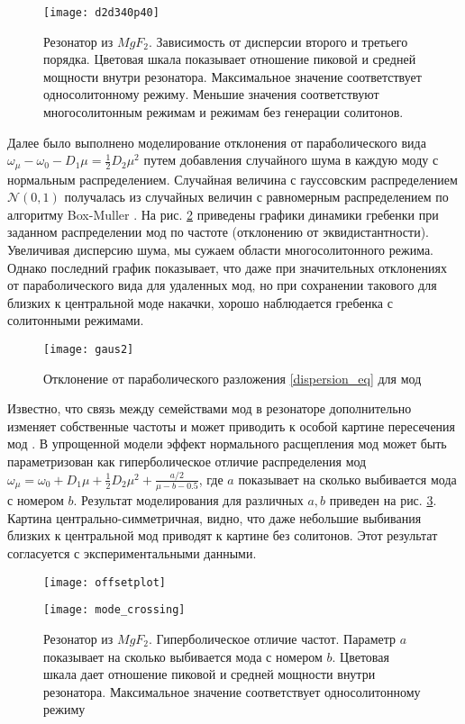 \begin{figure}
  \centering
  \texttt{[image: d2d340p40]}
  \caption{Резонатор из $MgF_2$. Зависимость от дисперсии второго и третьего порядка. Цветовая шкала показывает отношение пиковой и средней мощности внутри резонатора. Максимальное значение соответствует односолитонному режиму. Меньшие значения соответствуют многосолитонным режимам и режимам без генерации солитонов.} \label{d2d3_plot}
\end{figure}

Далее было выполнено моделирование отклонения от параболического вида $\omega_\mu-\omega_0-D_1\mu=\frac{1}{2}D_2\mu^2$ путем добавления случайного шума в каждую моду с нормальным распределением. Случайная величина с гауссовским распределением $\mathcal{N}(0,1)$ получалась из случайных величин с равномерным распределением по алгоритму Box-Muller \cite{Numercial_recipes}. На рис. \ref{gaus} приведены графики динамики гребенки при заданном распределении мод по частоте (отклонению от эквидистантности). Увеличивая дисперсию шума, мы сужаем области многосолитонного режима. Однако последний график показывает, что даже при значительных отклонениях от параболического вида для удаленных мод, но при сохранении такового для близких к центральной моде накачки, хорошо наблюдается гребенка с солитонными режимами.

\begin{figure}
  \centering
  \texttt{[image: gaus2]}
  \caption{Отклонение от параболического разложения \eqref{dispersion_eq} для мод} \label{gaus}
\end{figure}

Известно, что связь между семействами мод в резонаторе дополнительно изменяет собственные частоты и может приводить к особой картине пересечения мод \cite{mode_spectrum_MLG}. В упрощенной модели эффект нормального расщепления мод может быть параметризован как гиперболическое отличие распределения мод $\omega_\mu=\omega_0+D_1\mu+\frac{1}{2}D_2\mu^2+\frac{a/2}{\mu-b-0.5}$, где $a$ показывает на сколько выбивается мода с номером $b$. Результат моделирования для различных $a,b$ приведен на рис. \ref{offsetplot}. Картина центрально-симметричная, видно, что даже небольшие выбивания близких к центральной мод приводят к картине без солитонов. Этот результат согласуется с экспериментальными данными.

\begin{figure}
  \centering
  \texttt{[image: offsetplot]}

  \texttt{[image: mode\_crossing]}
  \caption{Резонатор из $MgF_2$. Гиперболическое отличие частот. Параметр $a$ показывает на сколько выбивается мода с номером $b$. Цветовая шкала дает отношение пиковой и средней мощности внутри резонатора. Максимальное значение соответствует односолитонному режиму} \label{offsetplot}
\end{figure}

